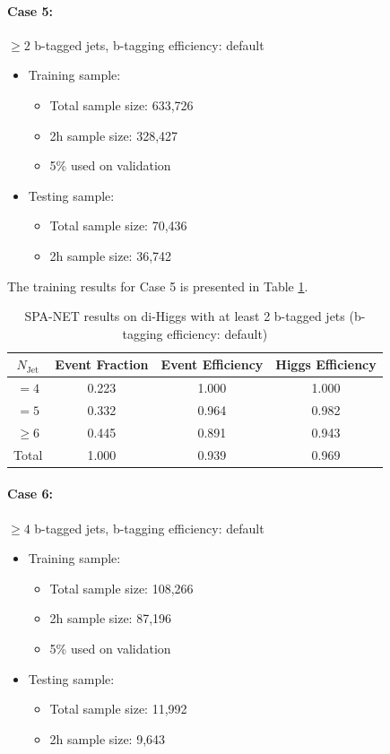 \documentclass[12pt]{article}
\begin{document}
		\paragraph{Case 5:}$\ge 2$ b-tagged jets, b-tagging efficiency: default 
		\begin{itemize}
			\item Training sample:
			\begin{itemize}
				\item Total sample size: 633,726
				\item 2h sample size: 328,427
				\item 5\% used on validation
			\end{itemize}
			\item Testing sample: 
				\begin{itemize}
					\item Total sample size: 70,436
					\item 2h sample size: 36,742
				\end{itemize}
		\end{itemize}
		The training results for Case 5 is presented in Table \ref{tab:SPANet_2btag_default}.
		\begin{table}[htpb]
			\centering
			\caption{SPA-NET results on di-Higgs with at least 2 b-tagged jets (b-tagging efficiency: default)}
			\label{tab:SPANet_2btag_default}
			\begin{tabular}{c|c|cc}
				$N_\text{Jet}$ & Event Fraction & Event Efficiency & Higgs Efficiency \\
				\hline
				$=4$	  &   0.223             &     1.000             &  1.000        \\
				$=5$	  &   0.332             &     0.964             &  0.982        \\
				$\ge 6$	  &   0.445             &     0.891             &  0.943        \\
				Total	  &   1.000             &     0.939             &  0.969        \\
			\end{tabular}
		\end{table}

		\paragraph{Case 6:}$\ge 4$ b-tagged jets, b-tagging efficiency: default 
		\begin{itemize}
			\item Training sample:
			\begin{itemize}
				\item Total sample size: 108,266
				\item 2h sample size: 87,196
				\item 5\% used on validation
			\end{itemize}
			\item Testing sample: 
				\begin{itemize}
					\item Total sample size: 11,992
					\item 2h sample size: 9,643
				\end{itemize}
		\end{itemize}
\end{document}
